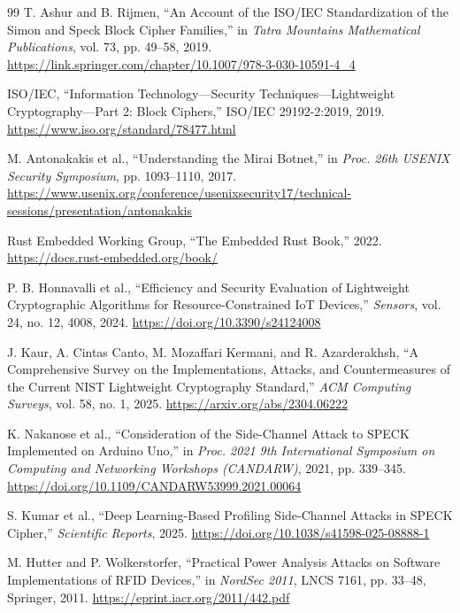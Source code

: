 \documentclass[12pt]{report}
\begin{document}
\begin{thebibliography}{99}
    T. Ashur and B. Rijmen, ``An Account of the ISO/IEC Standardization of the Simon and Speck Block Cipher Families,'' in \textit{Tatra Mountains Mathematical Publications}, vol. 73, pp. 49--58, 2019.
    \url{https://link.springer.com/chapter/10.1007/978-3-030-10591-4_4}

    ISO/IEC, ``Information Technology---Security Techniques---Lightweight Cryptography---Part 2: Block Ciphers,'' ISO/IEC 29192-2:2019, 2019.
    \url{https://www.iso.org/standard/78477.html}

    M. Antonakakis et al., ``Understanding the Mirai Botnet,'' in \textit{Proc. 26th USENIX Security Symposium}, pp. 1093--1110, 2017.
    \url{https://www.usenix.org/conference/usenixsecurity17/technical-sessions/presentation/antonakakis}

    Rust Embedded Working Group, ``The Embedded Rust Book,'' 2022.
    \url{https://docs.rust-embedded.org/book/}

    P. B. Honnavalli et al., ``Efficiency and Security Evaluation of Lightweight Cryptographic
    Algorithms for Resource-Constrained IoT Devices,'' \textit{Sensors}, vol. 24, no. 12, 4008, 2024.
    \url{https://doi.org/10.3390/s24124008}

    J. Kaur, A. Cintas Canto, M. Mozaffari Kermani, and R. Azarderakhsh, ``A Comprehensive
    Survey on the Implementations, Attacks, and Countermeasures of the Current NIST Lightweight
    Cryptography Standard,'' \textit{ACM Computing Surveys}, vol. 58, no. 1, 2025.
    \url{https://arxiv.org/abs/2304.06222}

    K. Nakanose et al., ``Consideration of the Side-Channel Attack to SPECK Implemented on
    Arduino Uno,'' in \textit{Proc. 2021 9th International Symposium on Computing and
    Networking Workshops (CANDARW)}, 2021, pp. 339--345.
    \url{https://doi.org/10.1109/CANDARW53999.2021.00064}

     S. Kumar et al., ``Deep Learning-Based Profiling Side-Channel Attacks in SPECK Cipher,''
     \textit{Scientific Reports}, 2025.
     \url{https://doi.org/10.1038/s41598-025-08888-1}

     M. Hutter and P. Wolkerstorfer, ``Practical Power Analysis Attacks on Software Implementations of RFID Devices,'' in \textit{NordSec 2011}, LNCS 7161, pp. 33--48, Springer, 2011.
     \url{https://eprint.iacr.org/2011/442.pdf}

\end{thebibliography}
\end{document}
